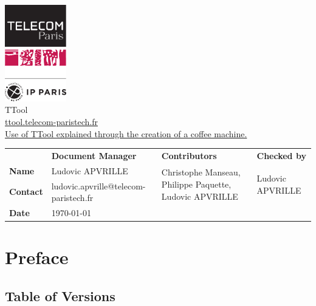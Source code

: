 \documentclass[12pt]{article}
\begin{document}
\sloppy 

\begin{center}

\includegraphics[width=0.2\textwidth]{fig/tp}
\vspace{10 pt}\\
\Huge TTool \\
\vspace{10 pt}
\Large \url{ttool.telecom-paristech.fr}
\vspace{20 pt}\\
\underline{\Large Use of TTool explained through the creation of a coffee machine.}
\vspace{30 pt}
\end{center}

\begin{table}[H]
\large
\centering
\begin{adjustbox}{width=\textwidth}
\begin{tabular}{ |p{1.6cm}|p{6.0cm}|p{4.2cm}|p{4.2cm}| }
\hhline{----}
 & \textbf{Document Manager} & \textbf{Contributors}  & \textbf{Checked by}  \\ 
\hhline{----}
\textbf{Name}   & Ludovic APVRILLE & \multirow{2}{4.2cm}{Christophe Manseau, Philippe Paquette,
Ludovic APVRILLE} &
\multirow{2}{*}{Ludovic APVRILLE} \\
\hhline{--~~}
\textbf{Contact} & ludovic.apvrille@telecom-paristech.fr &  &  \\ 
\hhline{--~~}
\textbf{Date} & \today &  &  \\ 
\hline
\end{tabular}
\end{adjustbox}
\end{table}

\newpage
\tableofcontents


\newpage
\section{Preface}

\subsection{Table of Versions}
\end{document}
